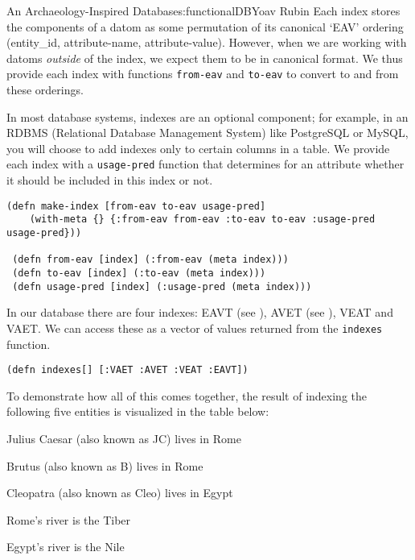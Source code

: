 \begin{aosachapter}{An Archaeology-Inspired Database}{s:functionalDB}{Yoav Rubin}
Each index stores the components of a datom as some permutation of its
canonical `EAV' ordering (entity\_id, attribute-name, attribute-value).
However, when we are working with datoms \emph{outside} of the index, we
expect them to be in canonical format. We thus provide each index with
functions \texttt{from-eav} and \texttt{to-eav} to convert to and from
these orderings.

In most database systems, indexes are an optional component; for
example, in an RDBMS (Relational Database Management System) like
PostgreSQL or MySQL, you will choose to add indexes only to certain
columns in a table. We provide each index with a \texttt{usage-pred}
function that determines for an attribute whether it should be included
in this index or not.

\begin{verbatim}
(defn make-index [from-eav to-eav usage-pred]
    (with-meta {} {:from-eav from-eav :to-eav to-eav :usage-pred usage-pred}))
 
 (defn from-eav [index] (:from-eav (meta index)))
 (defn to-eav [index] (:to-eav (meta index)))
 (defn usage-pred [index] (:usage-pred (meta index)))
\end{verbatim}

In our database there are four indexes: EAVT (see
), AVET (see
), VEAT and VAET. We can access these
as a vector of values returned from the \texttt{indexes} function.

\begin{verbatim}
(defn indexes[] [:VAET :AVET :VEAT :EAVT])
\end{verbatim}

To demonstrate how all of this comes together, the result of indexing
the following five entities is visualized in the table below:

\begin{aosaenumerate}
\def\labelenumi{\arabic{enumi}.}

\item
  Julius Caesar (also known as JC) lives in Rome
\item
  Brutus (also known as B) lives in Rome
\item
  Cleopatra (also known as Cleo) lives in Egypt
\item
  Rome's river is the Tiber
\item
  Egypt's river is the Nile
\end{aosaenumerate}


\end{aosachapter}
